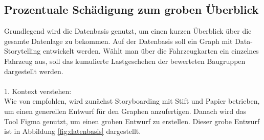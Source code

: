 \subsection{Prozentuale Schädigung zum groben Überblick}\label{section:Prozentuale_Schädigung}
Grundlegend wird die Datenbasis genutzt, um einen kurzen Überblick über die gesamte Datenlage zu bekommen. Auf der Datenbasis soll ein Graph mit Data-Storytelling entwickelt werden. Wählt man über die Fahrzeugkarten ein einzelnes Fahrzeug aus, soll das kumulierte Lastgeschehen der bewerteten Baugruppen dargestellt werden. \\\\
1. Kontext verstehen:\\
Wie von \cite{Knaflic.2016} empfohlen, wird zunächst Storyboarding mit Stift und Papier betrieben, um einen generellen Entwurf für den Graphen anzufertigen. Danach wird das Tool Figma \cite{FigmaGmbH.2024} genutzt, um einen groben Entwurf zu erstellen. Dieser grobe Entwurf ist in Abbildung \ref{fig:datenbasis} dargestellt.


